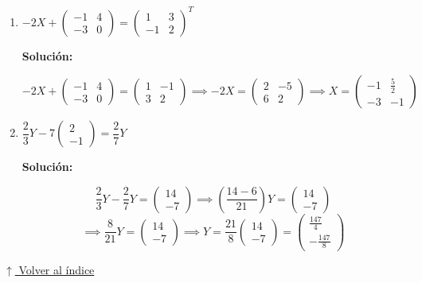 \documentclass[12pt]{article}
\newcommand{\solucion}{%
    \vspace{0.8em}%
    \textbf{Solución:}%
}
\newcommand{\volverindice}{%
    \vspace{1em}%
    \begin{flushright}%
        \hyperlink{indice}{\small $\uparrow$ Volver al índice}%
    \end{flushright}%
}
\begin{document}
\begin{enumerate}[label=\alph*.-]
    \item $-2X + \begin{pmatrix} -1 & 4 \\ -3 & 0 \end{pmatrix} = \begin{pmatrix} 1 & 3 \\ -1 & 2 \end{pmatrix}^T$

    \solucion
    \[
    -2X + \begin{pmatrix}-1&4\\-3&0\end{pmatrix} = \begin{pmatrix}1&-1\\3&2\end{pmatrix}
    \implies
    -2X = \begin{pmatrix}2&-5\\6&2\end{pmatrix}
    \implies
    X = \begin{pmatrix}-1&\frac{5}{2}\\-3&-1\end{pmatrix}
    \]

    \item $\dfrac{2}{3}Y - 7\begin{pmatrix} 2 \\ -1 \end{pmatrix} = \dfrac{2}{7}Y$

    \solucion
    \[
    \frac{2}{3}Y - \frac{2}{7}Y = \begin{pmatrix}14\\-7\end{pmatrix}
    \implies
    \left(\frac{14-6}{21}\right)Y = \begin{pmatrix}14\\-7\end{pmatrix}
    \]
    \[
    \implies
    \frac{8}{21}Y = \begin{pmatrix}14\\-7\end{pmatrix}
    \implies
    Y = \frac{21}{8}\begin{pmatrix}14\\-7\end{pmatrix}
    = \begin{pmatrix}\frac{147}{4}\\[4pt]-\frac{147}{8}\end{pmatrix}
    \]
\end{enumerate}

\volverindice
\newpage
\end{document}
